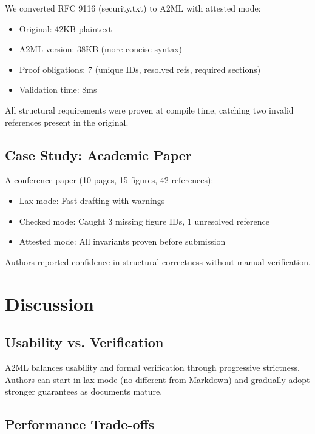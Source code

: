 \documentclass[10pt,twocolumn]{article}
\begin{document}
We converted RFC 9116 (security.txt) to A2ML with attested mode:

\begin{itemize}
  \item Original: 42KB plaintext
  \item A2ML version: 38KB (more concise syntax)
  \item Proof obligations: 7 (unique IDs, resolved refs, required sections)
  \item Validation time: 8ms
\end{itemize}

\noindent All structural requirements were proven at compile time, catching two invalid references present in the original.

\subsection{Case Study: Academic Paper}

A conference paper (10 pages, 15 figures, 42 references):

\begin{itemize}
  \item Lax mode: Fast drafting with warnings
  \item Checked mode: Caught 3 missing figure IDs, 1 unresolved reference
  \item Attested mode: All invariants proven before submission
\end{itemize}

\noindent Authors reported confidence in structural correctness without manual verification.

\section{Discussion}

\subsection{Usability vs. Verification}

A2ML balances usability and formal verification through progressive strictness. Authors can start in lax mode (no different from Markdown) and gradually adopt stronger guarantees as documents mature.

\subsection{Performance Trade-offs}
\end{document}
